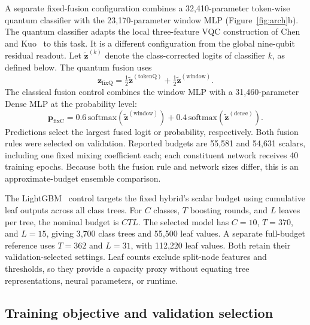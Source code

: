 \documentclass[aps,a4paper,onecolumn,11pt,unpublished]{quantumarticle}
\begin{document}
A separate fixed-fusion configuration combines a 32{,}410-parameter token-wise quantum classifier with the 23{,}170-parameter window MLP (Figure~\ref{fig:arch}b). The quantum classifier adapts the local three-feature VQC construction of Chen and Kuo~\cite{chenkuo2026} to this task. It is a different configuration from the global nine-qubit residual readout. Let $\tilde{\mathbf z}^{(k)}$ denote the class-corrected logits of classifier $k$, as defined below. The quantum fusion uses
\begin{equation}
\mathbf{z}_{\mathrm{fixQ}}=
\tfrac12\tilde{\mathbf z}^{(\mathrm{tokenQ})}+
\tfrac12\tilde{\mathbf z}^{(\mathrm{window})}.
\label{eq:fixedquantum}
\end{equation}
The classical fusion control combines the window MLP with a 31{,}460-parameter Dense MLP at the probability level:
\begin{equation}
\mathbf{p}_{\mathrm{fixC}}=
0.6\,\mathrm{softmax}(\tilde{\mathbf z}^{(\mathrm{window})})+
0.4\,\mathrm{softmax}(\tilde{\mathbf z}^{(\mathrm{dense})}).
\label{eq:fixedclassical}
\end{equation}
Predictions select the largest fused logit or probability, respectively. Both fusion rules were selected on validation. Reported budgets are 55{,}581 and 54{,}631 scalars, including one fixed mixing coefficient each; each constituent network receives 40 training epochs. Because both the fusion rule and network sizes differ, this is an approximate-budget ensemble comparison.

The LightGBM~\cite{lightgbm} control targets the fixed hybrid's scalar budget using cumulative leaf outputs across all class trees. For $C$ classes, $T$ boosting rounds, and $L$ leaves per tree, the nominal budget is $CTL$. The selected model has $C=10$, $T=370$, and $L=15$, giving 3{,}700 class trees and 55{,}500 leaf values. A separate full-budget reference uses $T=362$ and $L=31$, with 112{,}220 leaf values. Both retain their validation-selected settings. Leaf counts exclude split-node features and thresholds, so they provide a capacity proxy without equating tree representations, neural parameters, or runtime.

\subsection{Training objective and validation selection}
\end{document}
